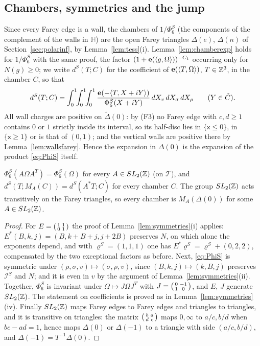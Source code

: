\subsection{Chambers, symmetries and the jump}
Since every Farey edge is a wall, the chambers of $1/\Phi^S_6$ (the components of the complement of the walls in $\mathbb H$) are the open Farey triangles $\Delta(e)$, $\Delta(n)$ of Section~\ref{sec:polarinf}, by Lemma~\ref{lem:tess}(i). Lemma~\ref{lem:chamberexp} holds for $1/\Phi^S_6$ with the same proof, the factor $(1+\mathbf e(\langle g,\Omega\rangle))^{-C_1}$ occurring only for $N(g)\ge0$; we write $d^S(T;C)$ for the coefficient of $\mathbf e(\langle T,\Omega\rangle)$, $T\in\mathbb{Z}^3$, in the chamber $C$, so that
\[
d^S(T;C)=\int_0^1\!\!\int_0^1\!\!\int_0^1\frac{\mathbf e(-\langle T,X+iY\rangle)}{\Phi^S_6(X+iY)}\,dX_v\,dX_\sigma\,dX_\rho\qquad(Y\in\tilde C).
\]
All wall charges are positive on $\tilde\Delta(0)$: by (F3) no Farey edge with $c,d\ge1$ contains $0$ or $1$ strictly inside its interval, so its half-disc lies in $\{\mathsf x\le0\}$, in $\{\mathsf x\ge1\}$ or is that of $(0,1)$; and the vertical walls are positive there by Lemma~\ref{lem:wallsfarey}. Hence the expansion in $\Delta(0)$ is the expansion of the product \eqref{eq:PhiS} itself.

\begin{lemma}\label{lem:symS}
$\Phi^S_6(A\Omega A^T)=\Phi^S_6(\Omega)$ for every $A\in SL_2(\mathbb{Z})$ (on $\mathcal T$), and $d^S(T;M_A(C))=d^S(A^\ast T;C)$ for every chamber $C$. The group $SL_2(\mathbb{Z})$ acts transitively on the Farey triangles, so every chamber is $M_A(\Delta(0))$ for some $A\in SL_2(\mathbb{Z})$.
\end{lemma}

\begin{proof}
For $E=\begin{psmallmatrix}1&1\\0&1\end{psmallmatrix}$ the proof of Lemma~\ref{lem:symmetries}(i) applies: $E^\ast(B,k,j)=(B,k+B+j,j+2B)$ preserves $N$, on which alone the exponents depend, and with $\varrho^S=(1,1,1)$ one has $E^\ast\varrho^S=\varrho^S+(0,2,2)$, compensated by the two exceptional factors as before. Next, \eqref{eq:PhiS} is symmetric under $(\rho,\sigma,v)\mapsto(\sigma,\rho,v)$, since $(B,k,j)\mapsto(k,B,j)$ preserves $\mathcal I^S$ and $N$; and it is even in $v$ by the argument of Lemma~\ref{lem:symmetries}(ii). Together, $\Phi^S_6$ is invariant under $\Omega\mapsto J\Omega J^T$ with $J=\begin{psmallmatrix}0&-1\\1&0\end{psmallmatrix}$, and $E$, $J$ generate $SL_2(\mathbb{Z})$. The statement on coefficients is proved as in Lemma~\ref{lem:symmetries}(iv). Finally $SL_2(\mathbb{Z})$ maps Farey edges to Farey edges and triangles to triangles, and it is transitive on triangles: the matrix $\begin{psmallmatrix}b&a\\d&c\end{psmallmatrix}$ maps $0,\infty$ to $a/c,b/d$ when $bc-ad=1$, hence maps $\Delta(0)$ or $\Delta(-1)$ to a triangle with side $(a/c,b/d)$, and $\Delta(-1)=T^{-1}\Delta(0)$.
\end{proof}


